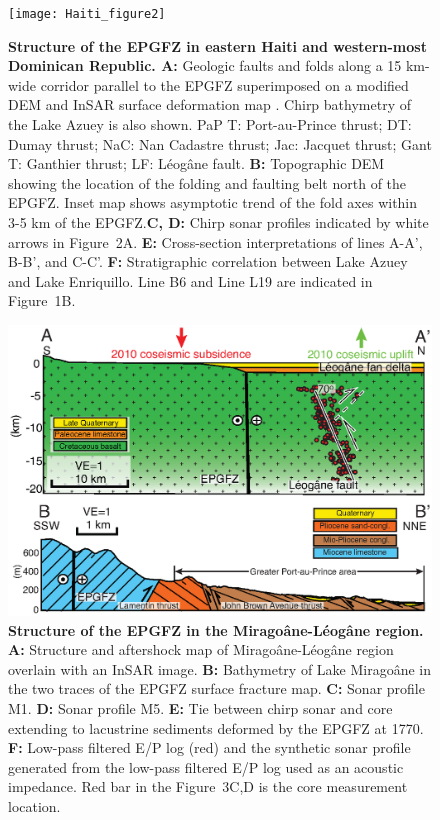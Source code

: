 \documentclass{nature}
\begin{document}
\begin{figure}[b]
\centering
\texttt{[image: Haiti\_figure2]}
\label{figure2}
\end{figure}

\begin{figure}[p]
\centering
\caption{\textbf{Structure of the EPGFZ in eastern Haiti and western-most Dominican Republic. A:} Geologic faults and folds along a 15 km-wide corridor parallel to the EPGFZ superimposed on a modified DEM and InSAR surface deformation map \citep{hayes2010complex,hashimoto2011fan}. Chirp bathymetry of the Lake Azuey is also shown. PaP T: Port-au-Prince thrust; DT: Dumay thrust; NaC: Nan Cadastre thrust; Jac: Jacquet thrust; Gant T: Ganthier thrust; LF: L\'eog\^ane fault. \textbf{B:} Topographic DEM showing the location of the folding and faulting belt north of the EPGFZ. Inset map shows asymptotic trend of the fold axes within 3-5 km of the EPGFZ.\textbf{C, D:} Chirp sonar profiles indicated by white arrows in Figure~2A. \textbf{E:} Cross-section interpretations of lines A-A', B-B', and C-C'. \textbf{F:} Stratigraphic correlation between Lake Azuey and Lake Enriquillo. Line B6 and Line L19 are indicated in Figure~1B.}
\label{figure2}
\end{figure}

\begin{figure}
\centering
\includegraphics[width=\textwidth]{Haiti_figure3}
\caption{\textbf{Structure of the EPGFZ in the Mirago\^ane-L\'eog\^ane region. A:} Structure \citep{prentice2010seismic} and aftershock \citep{douilly2015three} map of Mirago\^ane-L\'eog\^ane region overlain with an InSAR image. \textbf{B:} Bathymetry of Lake Mirago\^ane in the two traces of the EPGFZ surface fracture map. \textbf{C:} Sonar profile M1. \textbf{D:} Sonar profile M5. \textbf{E:} Tie between chirp sonar and core \citep{higuera199910} extending to lacustrine sediments deformed by the EPGFZ at 1770. \textbf{F:} Low-pass filtered E/P log (red) and the synthetic sonar profile generated from the low-pass filtered E/P log used as an acoustic impedance. Red bar in the Figure~3C,D is the core measurement \citep{higuera199910} location.}
\label{figure3}
\end{figure}
\end{document}
